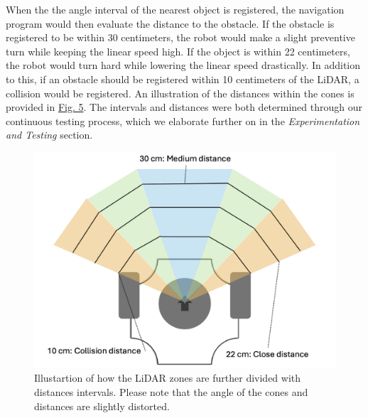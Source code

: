 \documentclass[conference]{IEEEtran}
\begin{document}
When the the angle interval of the nearest object is registered, the navigation program would then evaluate the distance to the obstacle.
If the obstacle is registered to be within 30 centimeters, the robot would make a slight preventive turn while keeping the linear speed high.
If the object is within 22 centimeters, the robot would turn hard while lowering the linear speed drastically.
In addition to this, if an obstacle should be registered within 10 centimeters of the LiDAR, a collision would be registered.
An illustration of the distances within the cones is provided in \href{sec:distances}{Fig. 5}.
The intervals and distances were both determined through our continuous testing process, which we elaborate further on in the \textit{Experimentation and Testing} section.

\begin{figure}[t]
    \centerline{\includegraphics[width=1.0\columnwidth]{Pictures/LiDAR Distances.png}}
    \caption{Illustartion of how the LiDAR zones are further divided with distances intervals. 
    Please note that the angle of the cones and distances are slightly distorted.}
    \label{sec:distances}
    \end{figure}
\end{document}
